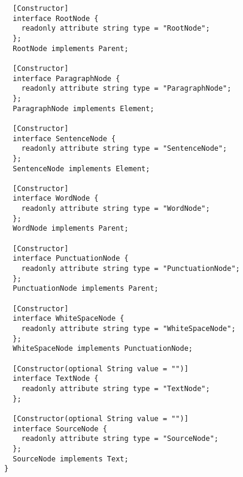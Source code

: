 \begin{lstlisting}
  [Constructor]
  interface RootNode {
    readonly attribute string type = "RootNode";
  };
  RootNode implements Parent;

  [Constructor]
  interface ParagraphNode {
    readonly attribute string type = "ParagraphNode";
  };
  ParagraphNode implements Element;

  [Constructor]
  interface SentenceNode {
    readonly attribute string type = "SentenceNode";
  };
  SentenceNode implements Element;

  [Constructor]
  interface WordNode {
    readonly attribute string type = "WordNode";
  };
  WordNode implements Parent;

  [Constructor]
  interface PunctuationNode {
    readonly attribute string type = "PunctuationNode";
  };
  PunctuationNode implements Parent;

  [Constructor]
  interface WhiteSpaceNode {
    readonly attribute string type = "WhiteSpaceNode";
  };
  WhiteSpaceNode implements PunctuationNode;

  [Constructor(optional String value = "")]
  interface TextNode {
    readonly attribute string type = "TextNode";
  };

  [Constructor(optional String value = "")]
  interface SourceNode {
    readonly attribute string type = "SourceNode";
  };
  SourceNode implements Text;
}
\end{lstlisting}
